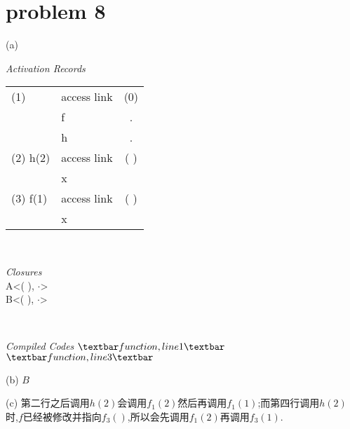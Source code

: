 \documentclass[4paper,10pt]{paper}
\begin{document}
\section*{problem 8}
(a)\\
\begin{minipage}{.45\textwidth}
\centering
\textit{Activation Records}
\begin{tabular}{l|l|c}
\hline
 (1) 	& access link 	& (0) 	\\ \cline{2-3}
     	& f 				& .		\\  	 \cline{2-3}
    		& h 				& .		\\
\hline
(2) h(2) 	& access link 	& ( ) \\ \cline{2-3}
   			& x				& 	 \\
\hline
(3) 	f(1) 	& access link 	& ( )		\\ \cline{2-3}
 			& x				&		\\
\hline

\end{tabular}
\end{minipage}
\makeatletter\
\begin{minipage}{.3\textwidth}
\centering
\textit{Closures}\\
A<( ), $\cdot$>\\
B<( ), $\cdot$>
\end{minipage}  
\makeatletter\
\begin{minipage}{.2\textwidth}
\centering
\textit{Compiled Codes}
$\textbar function, line 1 \textbar$\\
$\textbar function, line 3 \textbar$
\end{minipage}

(b) $B$

(c) 第二行之后调用$h(2)$会调用$f_{1}(2)$然后再调用$f_{1}(1)$;而第四行调用$h(2)$时,$f$已经被修改并指向$f_{3}()$,所以会先调用$f_{1}(2)$再调用$f_{3}(1)$.
\end{document}
